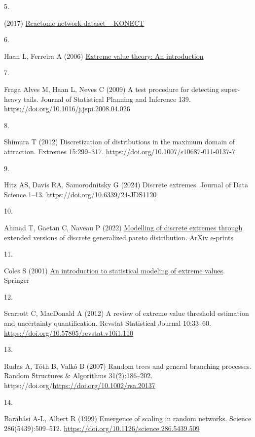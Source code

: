 \documentclass[
  10pt,
  a4paper,
]{scrreprt}
\newlength{\cslhangindent}
\newlength{\csllabelwidth}
\newlength{\cslentryspacingunit} %
\newenvironment{CSLReferences}[2] %
 {%
  \setlength{\parindent}{0pt}
  \ifodd #1
  \let\oldpar\par
  \def\par{\hangindent=\cslhangindent\oldpar}
  \fi
  \setlength{\parskip}{#2\cslentryspacingunit}
 }%
 {}
\newcommand{\CSLLeftMargin}[1]{\parbox[t]{\csllabelwidth}{#1}}
\newcommand{\CSLRightInline}[1]{\parbox[t]{\linewidth - \csllabelwidth}{#1}\break}
\theoremstyle{definition}
\theoremstyle{plain}
\theoremstyle{plain}
\theoremstyle{remark}
\begin{document}
{\begin{CSLReferences}{0}{0}
\leavevmode{}%
\CSLLeftMargin{5. }%
\CSLRightInline{(2017)
\href{http://konect.cc/networks/reactome}{Reactome network dataset --
{KONECT}}}

\leavevmode{}%
\CSLLeftMargin{6. }%
\CSLRightInline{Haan L, Ferreira A (2006)
\href{https://doi.org/10.1007/0-387-34471-3}{Extreme value theory: An
introduction}}

\leavevmode{}%
\CSLLeftMargin{7. }%
\CSLRightInline{Fraga Alves M, Haan L, Neves C (2009) A test procedure
for detecting super-heavy tails. Journal of Statistical Planning and
Inference 139. \url{https://doi.org/10.1016/j.jspi.2008.04.026}}

\leavevmode{}%
\CSLLeftMargin{8. }%
\CSLRightInline{Shimura T (2012) Discretization of distributions in the
maximum domain of attraction. Extremes 15:299--317.
\url{https://doi.org/10.1007/s10687-011-0137-7}}

\leavevmode{}%
\CSLLeftMargin{9. }%
\CSLRightInline{Hitz AS, Davis RA, Samorodnitsky G (2024) Discrete
extremes. Journal of Data Science 1--13.
\url{https://doi.org/10.6339/24-JDS1120}}

\leavevmode{}%
\CSLLeftMargin{10. }%
\CSLRightInline{Ahmad T, Gaetan C, Naveau P (2022)
\href{https://arxiv.org/abs/2210.15253}{Modelling of discrete extremes
through extended versions of discrete generalized pareto distribution}.
ArXiv e-prints}

\leavevmode{}%
\CSLLeftMargin{11. }%
\CSLRightInline{Coles S (2001)
\href{https://books.google.co.uk/books?id=2nugUEaKqFEC}{An introduction
to statistical modeling of extreme values}. Springer}

\leavevmode{}%
\CSLLeftMargin{12. }%
\CSLRightInline{Scarrott C, MacDonald A (2012) A review of extreme value
threshold estimation and uncertainty quantification. Revstat Statistical
Journal 10:33--60. \url{https://doi.org/10.57805/revstat.v10i1.110}}

\leavevmode{}%
\CSLLeftMargin{13. }%
\CSLRightInline{Rudas A, Tóth B, Valkó B (2007) Random trees and general
branching processes. Random Structures \& Algorithms 31(2):186--202.
https://doi.org/\url{https://doi.org/10.1002/rsa.20137}}

\leavevmode{}%
\CSLLeftMargin{14. }%
\CSLRightInline{Barabási A-L, Albert R (1999) Emergence of scaling in
random networks. Science 286(5439):509--512.
\url{https://doi.org/10.1126/science.286.5439.509}}


\end{CSLReferences}}
\end{document}
